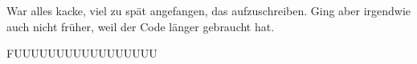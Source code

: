 

War alles kacke, viel zu spät angefangen, das aufzuschreiben. Ging aber irgendwie auch nicht früher, weil der Code länger gebraucht hat.

FUUUUUUUUUUUUUUUUU 

